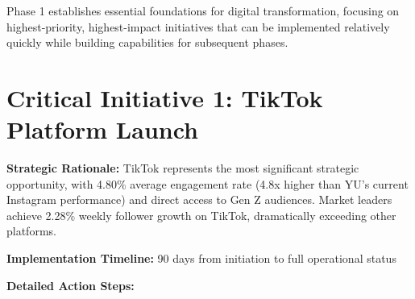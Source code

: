 \documentclass[12pt]{report}
\begin{document}
Phase 1 establishes essential foundations for digital transformation, focusing on highest-priority, highest-impact initiatives that can be implemented relatively quickly while building capabilities for subsequent phases.

\section{Critical Initiative 1: TikTok Platform Launch}

\textbf{Strategic Rationale:} TikTok represents the most significant strategic opportunity, with 4.80\% average engagement rate (4.8x higher than YU's current Instagram performance) and direct access to Gen Z audiences. Market leaders achieve 2.28\% weekly follower growth on TikTok, dramatically exceeding other platforms.

\textbf{Implementation Timeline:} 90 days from initiation to full operational status

\textbf{Detailed Action Steps:}
\end{document}
